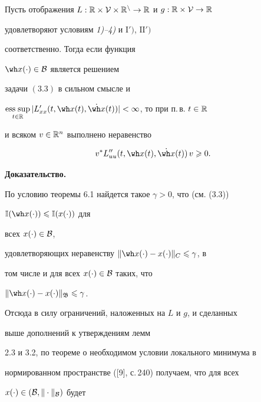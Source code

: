 


\begin{thms} 

Пусть отображения $L:\Bbb R\times\cal V\times\Bbb

R^n\to\Bbb R$ и $g:\Bbb R\times\cal V\to\Bbb R$

удовлетворяют условиям {\em 1)--4)} и $\mathrm I')$, $\mathrm{II}')$

соответственно. Тогда если функция

$\wh x(\cdot)\in\cal B$ является решением

задачи $(3.3)$ в сильном смысле и

$\esssup\limits_{t\in\Bbb R}|L'_{xx}(t,\wh

x(t),\Dot{\wh x}(t))|<\infty$, то при п.\,в. $t\in\Bbb R$

и всяком $v\in \Bbb R^n$ выполнено неравенство

\begin{equation}

v^{*}L''_{uu}(t,\wh x(t),\dot{\wh x}(t))\,v\geqslant0.

\end{equation}

\end{thms}



{\bf Доказательство.}

По условию теоремы 6.1 найдется такое $\gamma>0$, что (см. (3.3))\linebreak

$\Bbb I(\wh x(\cdot))\leqslant\Bbb I(x(\cdot))$ для

всех $x(\cdot)\in\cal B$,

удовлетворяющих неравенству $\|\wh x(\cdot)-

x(\cdot)\|_C\leqslant\gamma$, в

том числе и для всех $x(\cdot)\in\cal B$ таких, что

$\|\wh x(\cdot)-x(\cdot)\|_{\frak B}\leqslant\gamma$.

Отсюда в силу ограничений, наложенных на $L$ и $g$, и сделанных 

выше дополнений к утверждениям лемм

2.3 и 3.2, по теореме о необходимом условии локального минимума в

нормированном пространстве ([9], с.\,240) получаем, что для всех

$x(\cdot)\in(\cal B,\|\cdot\|_{\cal B})$ будет

